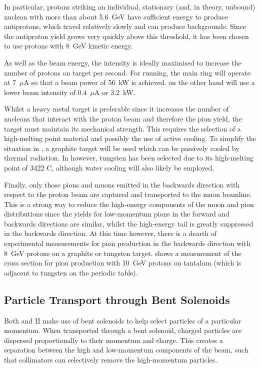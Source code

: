 In particular, protons striking an individual, stationary (and, in theory, unbound) nucleon with more than about 5.6~GeV have sufficient energy to produce antiprotons, which travel relatively slowly and can produce backgrounds.
Since the antiproton yield grows very quickly above this threshold, it has been chosen to use protons with 8~GeV kinetic energy.

As well as the beam energy, the intensity is ideally maximised to increase the number of protons on target per second.
For \phaseII running, the main ring will operate at 7~$\mu$A so that a beam power of 56~kW is achieved.  
\phaseI on the other hand will use a lower beam intensity of 0.4~$\mu$A or 3.2~kW.

Whilst a heavy metal target is preferable since it increases the number of nucleons that interact with the proton beam and therefore the pion yield,
the target must maintain its mechanical strength.
This requires the selection of a high-melting point material and possibly the use of active cooling.
To simplify the situation in \phaseI, a graphite target will be used which can be passively cooled by thermal radiation.
In \phaseII however, tungsten has been selected due to its high-melting point of 3422 C, although water cooling will also likely be employed.

\FigPionSpectraVsAngle

Finally, only those pions and muons emitted in the backwards direction with respect to the proton beam are captured and transported to the muon beamline.
This is a strong way to reduce the high-energy components of the muon and pion distributions since the yields for low-momentum pions in the forward and backwards directions are similar, whilst the high-energy tail is greatly suppressed in the backwards direction.
At this time however, there is a dearth of experimental measurements for pion production in the backwards direction with 8~GeV protons on a graphite or tungsten target.
 shows a measurement of the cross section for pion production with 10~GeV protons on tantalum (which is adjacent to tungsten on the periodic table).

\subsection{Particle Transport through Bent Solenoids}
Both \phaseI and II make use of bent solenoids to help select particles of a particular momentum.
When transported through a bent solenoid, charged particles are dispersed proportionally to their momentum and charge.
This creates a separation between the high and low-momentum components of the beam, such that collimators can selectively remove the high-momentum particles.

